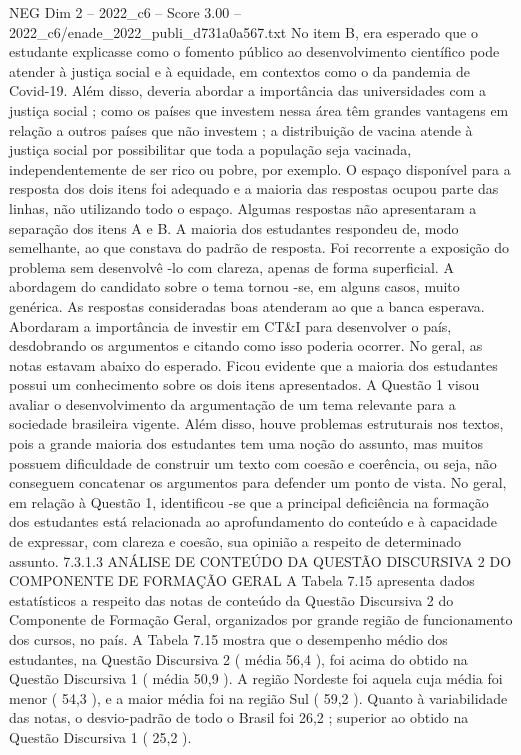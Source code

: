 \begin{textsample}{NEG Dim 2 – 2022\_c6 – Score 3.00 – 2022\_c6/enade\_2022\_publi\_d731a0a567.txt}
No item B, era esperado que o estudante explicasse como o fomento público ao desenvolvimento científico pode atender à justiça social e à equidade, em contextos como o da pandemia de Covid-19.
Além disso, deveria abordar a importância das universidades com a justiça social ; como os países que investem nessa área têm grandes vantagens em relação a outros países que não investem ; a distribuição de vacina atende à justiça social por possibilitar que toda a população seja vacinada, independentemente de ser rico ou pobre, por exemplo.
O espaço disponível para a resposta dos dois itens foi adequado e a maioria das respostas ocupou parte das linhas, não utilizando todo o espaço.
Algumas respostas não apresentaram a separação dos itens A e B.
A maioria dos estudantes respondeu de, modo semelhante, ao que constava do padrão de resposta.
Foi recorrente a exposição do problema sem desenvolvê -lo com clareza, apenas de forma superficial.
A abordagem do candidato sobre o tema tornou -se, em alguns casos, muito genérica.
As respostas consideradas boas atenderam ao que a banca esperava.
Abordaram a importância de investir em CT\&I para desenvolver o país, desdobrando os argumentos e citando como isso poderia ocorrer.
No geral, as notas estavam abaixo do esperado.
Ficou evidente que a maioria dos estudantes possui um conhecimento sobre os dois itens apresentados.
A Questão 1 visou avaliar o desenvolvimento da argumentação de um tema relevante para a sociedade brasileira vigente.
Além disso, houve problemas estruturais nos textos, pois a grande maioria dos estudantes tem uma noção do assunto, mas muitos possuem dificuldade de construir um texto com coesão e coerência, ou seja, não conseguem concatenar os argumentos para defender um ponto de vista.
No geral, em relação à Questão 1, identificou -se que a principal deficiência na formação dos estudantes está relacionada ao aprofundamento do conteúdo e à capacidade de expressar, com clareza e coesão, sua opinião a respeito de determinado assunto. 7.3.1.3 ANÁLISE DE CONTEÚDO DA QUESTÃO DISCURSIVA 2 DO COMPONENTE DE FORMAÇÃO GERAL A Tabela 7.15 apresenta dados estatísticos a respeito das notas de conteúdo da Questão Discursiva 2 do Componente de Formação Geral, organizados por grande região de funcionamento dos cursos, no país.
A Tabela 7.15 mostra que o desempenho médio dos estudantes, na Questão Discursiva 2 ( média 56,4 ), foi acima do obtido na Questão Discursiva 1 ( média 50,9 ).
A região Nordeste foi aquela cuja média foi menor ( 54,3 ), e a maior média foi na região Sul ( 59,2 ).
Quanto à variabilidade das notas, o desvio-padrão de todo o Brasil foi 26,2 ; superior ao obtido na Questão Discursiva 1 ( 25,2 ).

\end{textsample}
